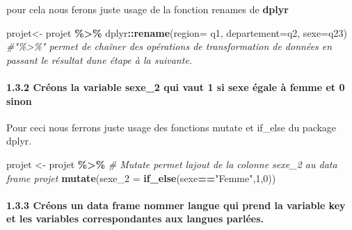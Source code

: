\documentclass[
]{article}
\newenvironment{Shaded}{\begin{snugshade}}{\end{snugshade}}
\newcommand{\AttributeTok}[1]{\textcolor[rgb]{0.13,0.29,0.53}{#1}}
\newcommand{\CommentTok}[1]{\textcolor[rgb]{0.56,0.35,0.01}{\textit{#1}}}
\newcommand{\DecValTok}[1]{\textcolor[rgb]{0.00,0.00,0.81}{#1}}
\newcommand{\FunctionTok}[1]{\textcolor[rgb]{0.13,0.29,0.53}{\textbf{#1}}}
\newcommand{\NormalTok}[1]{#1}
\newcommand{\OtherTok}[1]{\textcolor[rgb]{0.56,0.35,0.01}{#1}}
\newcommand{\SpecialCharTok}[1]{\textcolor[rgb]{0.81,0.36,0.00}{\textbf{#1}}}
\newcommand{\StringTok}[1]{\textcolor[rgb]{0.31,0.60,0.02}{#1}}
\begin{document}
pour cela nous ferons juste usage de la fonction renames de
\textbf{dplyr}

\begin{Shaded}
\begin{Highlighting}[]
\NormalTok{projet}\OtherTok{\textless{}{-}}\NormalTok{ projet }\SpecialCharTok{\%\textgreater{}\%}\NormalTok{ dplyr}\SpecialCharTok{::}\FunctionTok{rename}\NormalTok{(}\AttributeTok{region=}\NormalTok{ q1, }\AttributeTok{departement=}\NormalTok{q2, }\AttributeTok{sexe=}\NormalTok{q23) }\CommentTok{\#"\%\textgreater{}\%" permet de chaîner des opérations de transformation de données en passant le résultat d\textquotesingle{}une étape à la suivante.}
\end{Highlighting}
\end{Shaded}

\hypertarget{cruxe9ons-la-variable-sexe_2-qui-vaut-1-si-sexe-uxe9gale-uxe0-femme-et-0-sinon}{%
\paragraph{1.3.2 Créons la variable sexe\_2 qui vaut 1 si sexe égale à
femme et 0
sinon}\label{cruxe9ons-la-variable-sexe_2-qui-vaut-1-si-sexe-uxe9gale-uxe0-femme-et-0-sinon}}

Pour ceci nous ferrons juste usage des fonctions mutate et if\_else du
package dplyr.

\begin{Shaded}
\begin{Highlighting}[]
\NormalTok{projet }\OtherTok{\textless{}{-}}\NormalTok{ projet }\SpecialCharTok{\%\textgreater{}\%}
  \CommentTok{\# Mutate permet l\textquotesingle{}ajout de la colonne sexe\_2 au data frame projet}
  \FunctionTok{mutate}\NormalTok{(}\AttributeTok{sexe\_2 =} \FunctionTok{if\_else}\NormalTok{(sexe}\SpecialCharTok{==}\StringTok{"Femme"}\NormalTok{,}\DecValTok{1}\NormalTok{,}\DecValTok{0}\NormalTok{))}
\end{Highlighting}
\end{Shaded}

\hypertarget{cruxe9ons-un-data-frame-nommer-langue-qui-prend-la-variable-key-et-les-variables-correspondantes-aux-langues-parluxe9es.}{%
\paragraph{1.3.3 Créons un data frame nommer langue qui prend la
variable key et les variables correspondantes aux langues
parlées.}\label{cruxe9ons-un-data-frame-nommer-langue-qui-prend-la-variable-key-et-les-variables-correspondantes-aux-langues-parluxe9es.}}
\end{document}
